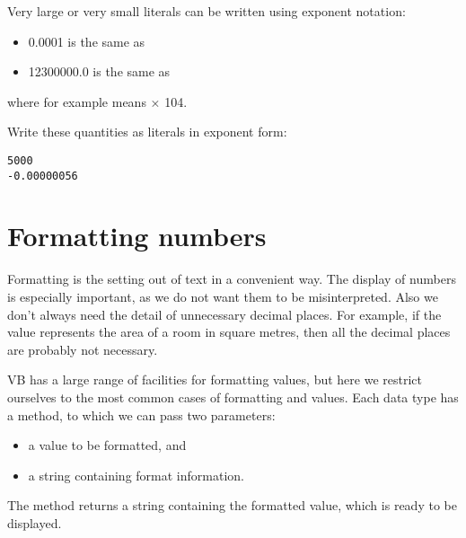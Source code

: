 		Very large or very small  literals can be written using exponent notation:
		\begin{itemize}
			\item 0.0001 is the same as 
			\item 12300000.0 is the same as 
		\end{itemize}
		where for example  means × 104.
		
		\begin{stqb}
			\begin{STQ}
			\item	Write these quantities as literals in exponent form:
				\begin{lstlisting}
5000
-0.00000056
				\end{lstlisting}
			\end{STQ}
		\end{stqb}


	\section{Formatting numbers}
	Formatting is the setting out of text in a convenient way. The display of numbers is especially important, as we do not want them to be misinterpreted. Also we don't always need the detail of unnecessary decimal places. For example, if the value  represents the area of a room in square metres, then all the decimal places are probably not necessary.
		
	VB has a large range of facilities for formatting values, but here we restrict ourselves to the most common cases of formatting  and  values. Each data type has a  method, to which we can pass two parameters:
		\begin{itemize}
      \item a value to be formatted, and
      \item a string containing format information.
		\end{itemize}
		The method returns a string containing the formatted value, which is ready to be displayed.
		
